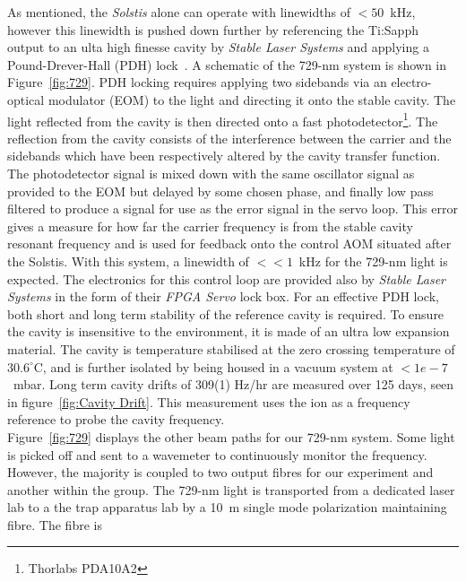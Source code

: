     As mentioned, the \emph{Solstis} alone can operate with linewidths of
    $<50$~kHz, however this linewidth is pushed down further by referencing the Ti:Sapph output
    to an ulta high finesse cavity by \emph{Stable Laser Systems} and applying
    a Pound-Drever-Hall (PDH) lock~\cite{drever1983laser}. 
    A schematic of the 729-nm system is
    shown in Figure~\ref{fig:729}.  PDH locking requires applying two sidebands
    via an electro-optical modulator (EOM) to the light and directing it onto
    the stable cavity. The light reflected from the cavity is then directed onto
    a fast photodetector\footnote{Thorlabs PDA10A2}. The reflection from the
    cavity consists of the interference between the carrier and the sidebands
    which have been respectively altered by the cavity transfer function. The
    photodetector signal is mixed down with the same oscillator signal as
    provided to the EOM but delayed by some chosen phase, and finally low pass
    filtered to produce a signal for use as the error signal in the servo loop.
    This error gives a measure for how far the carrier frequency is from the
    stable cavity resonant frequency and is used for feedback onto the control
    AOM situated after the Solstis.
    With this system, a linewidth of $<<1$~kHz for the 729-nm light is expected. 
    The electronics for this control loop are
    provided also by \emph{Stable Laser Systems} in the form of their \emph{FPGA Servo}
    lock box. For an effective PDH lock, both short and long term
    stability of the reference cavity is required. To ensure the cavity is insensitive to
    the environment, it is made of an ultra low expansion material. 
    The cavity is temperature stabilised at the zero crossing temperature of
    $30.6^\circ$C, and is further isolated by being housed in a vacuum system
    at $<1e-7$~mbar. Long term cavity drifts of 309(1) Hz/hr are measured over
    125 days, seen in figure~\ref{fig:Cavity Drift}. This measurement uses the ion as a
    frequency reference to probe the cavity frequency.\\
    Figure~\ref{fig:729} displays the other beam paths for our 729-nm system.
    Some light is picked off and sent to a wavemeter to continuously monitor the
    frequency. However, the majority is coupled to two output fibres for our
    experiment and another within the group. The 729-nm light is transported from
    a dedicated laser lab to a the trap apparatus lab by a 10~m
    single mode polarization maintaining fibre.  The fibre is
